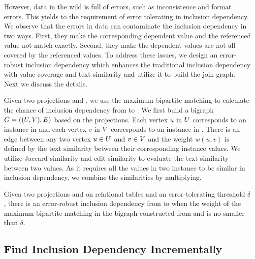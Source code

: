 However, data in the wild is full of errors, such as inconsistence and format errors. This yields to the requirement of error tolerating in inclusion dependency. We observe that the errors in data can contaminate the inclusion dependency in two ways. First, they make the corresponding dependent value and the referenced value not match exactly. Second, they make the dependent values are not all covered by the referenced values. To address these issues, we design an error-robust inclusion dependency which enhances the traditional inclusion dependency with value coverage and text similarity and utilize it to build the join graph. Next we discuss the details.


Given two projections \RX and \SY, we use the maximum bipartite matching to calculate the chance of inclusion dependency from \RX to \SY. We first build a bigraph $G=((U,V),E)$ based on the projections. Each vertex $u$ in $U$ corresponds to an instance in \RX and each vertex $v$ in $V$ corresponds to an instance in \SY. There is an edge between any two vertex $u\in U$ and $v\in V$ and the weight $w(u,v)$ is defined by the text similarity between their corresponding instance values. We utilize Jaccard similarity and edit similarity to evaluate the text similarity between two values. As it requires all the values in two instance to be similar in inclusion dependency, we combine the similarities by multiplying. 



\begin{definition}
Given two projections \RX and \SY on relational tables and an error-tolerating threshold $\delta$, there is an error-robust inclusion dependency from \X to \Y when the weight of the maximum bipartite matching in the bigraph constructed from \RX and \SY is no smaller than $\delta$.
\end{definition}




\subsection{Find Inclusion Dependency Incrementally}\label{subsec:incremental}


